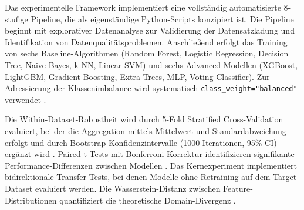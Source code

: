 \documentclass[11pt,a4paper]{article}
\begin{document}

    Das experimentelle Framework implementiert eine vollständig automatisierte 8-stufige Pipeline, die als eigenständige Python-Scripts konzipiert ist. Die Pipeline beginnt mit explorativer Datenanalyse zur Validierung der Datensatzladung und Identifikation von Datenqualitätsproblemen. Anschließend erfolgt das Training von sechs Baseline-Algorithmen (Random Forest, Logistic Regression, Decision Tree, Naive Bayes, k-NN, Linear SVM) und sechs Advanced-Modellen (XGBoost, LightGBM, Gradient Boosting, Extra Trees, MLP, Voting Classifier). Zur Adressierung der Klassenimbalance wird systematisch \texttt{class\_weight="balanced"} verwendet \parencite{Hastie2009,Vinayakumar2019}.

    Die Within-Dataset-Robustheit wird durch 5-Fold Stratified Cross-Validation evaluiert, bei der die Aggregation mittels Mittelwert und Standardabweichung erfolgt und durch Bootstrap-Konfidenzintervalle (1000 Iterationen, 95\% CI) ergänzt wird \parencite{Hastie2009}. Paired t-Tests mit Bonferroni-Korrektur identifizieren signifikante Performance-Differenzen zwischen Modellen \parencite{Hastie2009}. Das Kernexperiment implementiert bidirektionale Transfer-Tests, bei denen Modelle ohne Retraining auf dem Target-Dataset evaluiert werden. Die Wasserstein-Distanz zwischen Feature-Distributionen quantifiziert die theoretische Domain-Divergenz \parencite{Bishop2006}.
\end{document}
